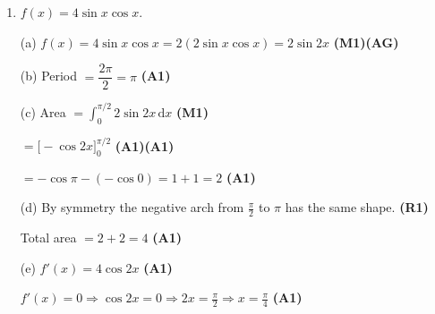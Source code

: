\documentclass[12pt, twoside]{article}
\begin{document}
\begin{enumerate}[itemsep=0.4cm]
$\cos^2\!\dfrac{\pi}{4}
= \left(\dfrac{\sqrt{2}}{2}\right)^{\!2} = \dfrac{1}{2}$
\hfill \textbf{(A1)}

Both equal $\frac{1}{2}$, so the graphs intersect at
$x = \frac{\pi}{4}$. \checkmark

\medskip
(b) $\cos 2x = 1 - 2\sin^2 x$ \hfill \textbf{(M1)}

$\sin^2 x = \dfrac{1 - \cos 2x}{2} = \dfrac{1}{2}(1 - \cos 2x)$
\hfill \textbf{(AG)}

\medskip
(c) $\displaystyle\int_0^{\pi} \sin^2 x \,\mathrm{d}x
= \int_0^{\pi} \tfrac{1}{2}(1 - \cos 2x)\,\mathrm{d}x$
\hfill \textbf{(M1)}

$= \left[\dfrac{x}{2} - \dfrac{\sin 2x}{4}\right]_0^{\pi}$
\hfill \textbf{(A1)(A1)}

$= \left(\dfrac{\pi}{2} - \dfrac{\sin 2\pi}{4}\right) - 0
= \dfrac{\pi}{2}$ \hfill \textbf{(A1)}

\medskip
(d) $\sin^2 x + \cos^2 x = 1$, so
$\displaystyle\int_0^{\pi} \cos^2 x \,\mathrm{d}x
= \int_0^{\pi}(1 - \sin^2 x)\,\mathrm{d}x$ \hfill \textbf{(M1)}

$= \pi - \dfrac{\pi}{2} = \dfrac{\pi}{2}$ \hfill \textbf{(A1)}

\bigskip

\item $f(x) = 4\sin x\cos x$.

(a) $f(x) = 4\sin x\cos x = 2(2\sin x\cos x) = 2\sin 2x$
\hfill \textbf{(M1)(AG)}

\medskip
(b) Period $= \dfrac{2\pi}{2} = \pi$ \hfill \textbf{(A1)}

\medskip
(c) Area $= \displaystyle\int_0^{\pi/2} 2\sin 2x \,\mathrm{d}x$
\hfill \textbf{(M1)}

$= \bigl[-\cos 2x\bigr]_0^{\pi/2}$ \hfill \textbf{(A1)(A1)}

$= -\cos\pi - (-\cos 0) = 1 + 1 = 2$ \hfill \textbf{(A1)}

\medskip
(d) By symmetry the negative arch from $\frac{\pi}{2}$ to $\pi$ has
the same shape. \hfill \textbf{(R1)}

Total area $= 2 + 2 = 4$ \hfill \textbf{(A1)}

\medskip
(e) $f'(x) = 4\cos 2x$ \hfill \textbf{(A1)}

$f'(x) = 0 \Rightarrow \cos 2x = 0 \Rightarrow 2x = \frac{\pi}{2}
\Rightarrow x = \frac{\pi}{4}$ \hfill \textbf{(A1)}

\end{enumerate}
\end{document}

